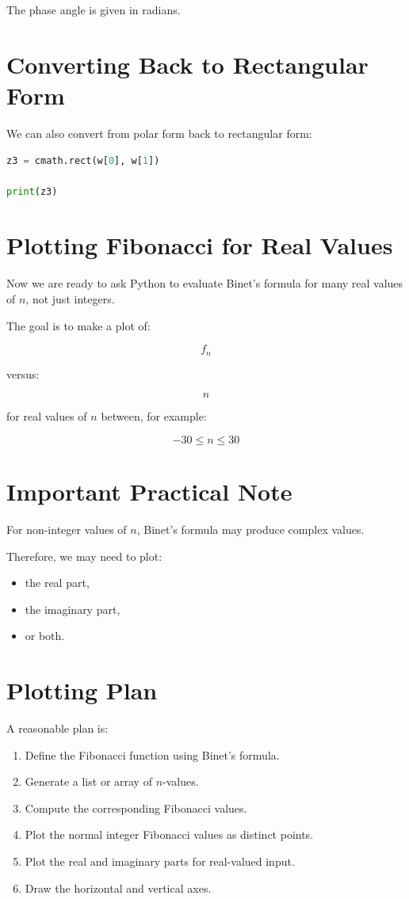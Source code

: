 \documentclass[11pt]{article}
\begin{document}
The phase angle is given in radians.

\section{Converting Back to Rectangular Form}

We can also convert from polar form back to rectangular form:

\begin{lstlisting}[language=Python]
z3 = cmath.rect(w[0], w[1])

print(z3)
\end{lstlisting}

\section{Plotting Fibonacci for Real Values}

Now we are ready to ask Python to evaluate Binet's formula for many real values of \(n\), not just integers.

The goal is to make a plot of:

\[
f_n
\]

versus:

\[
n
\]

for real values of \(n\) between, for example:

\[
-30 \le n \le 30
\]

\section{Important Practical Note}

For non-integer values of \(n\), Binet's formula may produce complex values.

Therefore, we may need to plot:

\begin{itemize}
    \item the real part,
    \item the imaginary part,
    \item or both.
\end{itemize}

\section{Plotting Plan}

A reasonable plan is:

\begin{enumerate}
    \item Define the Fibonacci function using Binet's formula.
    \item Generate a list or array of \(n\)-values.
    \item Compute the corresponding Fibonacci values.
    \item Plot the normal integer Fibonacci values as distinct points.
    \item Plot the real and imaginary parts for real-valued input.
    \item Draw the horizontal and vertical axes.
\end{enumerate}
\end{document}
